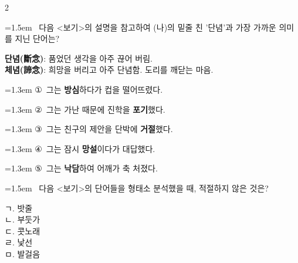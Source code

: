 \documentclass[10pt, a4paper]{article}
\begin{document}
\begin{multicols}{2}
\noindent\begin{minipage}{\columnwidth}
\vspace{2mm}
{\hangindent=1.5em  ~다음 <보기>의 설명을 참고하여 (나)의 밑줄 친 '단념'과 가장 가까운 의미를 지닌 단어는?\par}

\vspace{1mm}
\begin{boxibox}
\textbf{단념(斷念)}: 품었던 생각을 아주 끊어 버림. \\
\textbf{체념(諦念)}: 희망을 버리고 아주 단념함. 도리를 깨닫는 마음. \\
\end{boxibox}
\vspace{1mm}

\vspace{0.5mm}
{\hangindent=1.3em  \noindent\hspace{0.3em}①~그는 \textbf{방심}하다가 컵을 떨어뜨렸다.\par}
{\hangindent=1.3em  \noindent\hspace{0.3em}②~그는 가난 때문에 진학을 \textbf{포기}했다.\par}
{\hangindent=1.3em  \noindent\hspace{0.3em}③~그는 친구의 제안을 단박에 \textbf{거절}했다.\par}
{\hangindent=1.3em  \noindent\hspace{0.3em}④~그는 잠시 \textbf{망설}이다가 대답했다.\par}
{\hangindent=1.3em  \noindent\hspace{0.3em}⑤~그는 \textbf{낙담}하여 어깨가 축 처졌다.\par}
\vspace{4mm}
\end{minipage}
\par

\noindent\begin{minipage}{\columnwidth}
\vspace{2mm}
{\hangindent=1.5em  ~다음 <보기>의 단어들을 형태소 분석했을 때, 적절하지 않은 것은?\par}

\vspace{1mm}
\begin{boxibox}
ㄱ. 밧줄 \\
ㄴ. 부둣가 \\
ㄷ. 콧노래 \\
ㄹ. 낯선 \\
ㅁ. 발걸음 \\
\end{boxibox}
\vspace{1mm}


\end{minipage}
\end{multicols}
\end{document}
